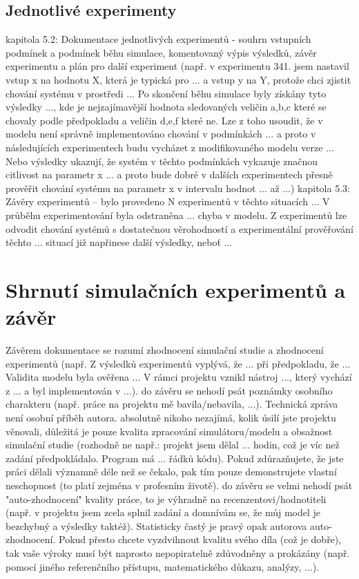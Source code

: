 \documentclass[a4paper,11pt]{article}
\begin{document}
\subsection{Jednotlivé experimenty}
kapitola 5.2: Dokumentace jednotlivých experimentů - souhrn vstupních podmínek a podmínek běhu simulace, komentovaný výpis výsledků, závěr experimentu a plán pro další experiment (např. v experimentu 341. jsem nastavil vstup x na hodnotu X, která je typická pro ... a vstup y na Y, protože chci zjistit chování systému v prostředi ... Po skončení běhu simulace byly získány tyto výsledky ..., kde je nejzajímavější hodnota sledovaných veličin a,b,c které se chovaly podle předpokladu a veličin d,e,f které ne. Lze z toho usoudit, že v modelu není správně implementováno chování v podmínkách ... a proto v následujících experimentech budu vycházet z modifikovaného modelu verze ... Nebo výsledky ukazují, že systém v těchto podmínkách vykazuje značnou citlivost na parametr x ... a proto bude dobré v dalších experimentech přesně prověřit chování systému na parametr x v intervalu hodnot ... až ...)
kapitola 5.3: Závěry experimentů – bylo provedeno N experimentů v těchto situacích ... V průběhu experimentování byla odstraněna ... chyba v modelu. Z experimentů lze odvodit chování systémů s dostatečnou věrohodností a experimentální prověřování těchto ... situací již napřinese další výsledky, neboť ...


\section{Shrnutí simulačních experimentů a závěr}

Závěrem dokumentace se rozumí zhodnocení simulační studie a zhodnocení experimentů (např. Z výsledků experimentů vyplývá, že ... při předpokladu, že ... Validita modelu byla ověřena ... V rámci projektu vznikl nástroj ..., který vychází z ... a byl implementován v ...).
do závěru se nehodí psát poznámky osobního charakteru (např. práce na projektu mě bavila/nebavila, ...). Technická zpráva není osobní příběh autora.
absolutně nikoho nezajímá, kolik úsilí jste projektu věnovali, důležitá je pouze kvalita zpracování simulátoru/modelu a obsažnost simulační studie (rozhodně ne např.: projekt jsem dělal ... hodin, což je víc než zadání předpokládalo. Program má ... řádků kódu). Pokud zdůrazňujete, že jste práci dělali významně déle než se čekalo, pak tím pouze demonstrujete vlastní neschopnost (to platí zejména v profesním životě).
do závěru se velmi nehodí psát "auto-zhodnocení" kvality práce, to je výhradně na recenzentovi/hodnotiteli (např. v projektu jsem zcela splnil zadání a domnívám se, že můj model je bezchybný a výsledky taktéž). Statisticky častý je pravý opak autorova auto-zhodnocení. Pokud přesto chcete vyzdvihnout kvalitu svého díla (což je dobře), tak vaše výroky musí být naprosto nepopiratelně zdůvodněny a prokázány (např. pomocí jiného referenčního přístupu, matematického důkazu, analýzy, ...).
\end{document}
